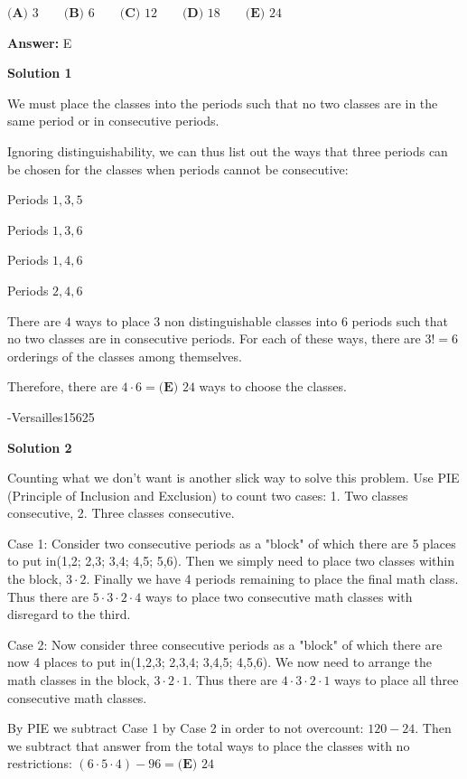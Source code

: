 \begin{enumerate}
 $\textbf{(A) }3\qquad\textbf{(B) }6\qquad\textbf{(C) }12\qquad\textbf{(D) }18\qquad\textbf{(E) }24$

 \textbf{Answer: }E



\textbf{Solution 1}

We must place the classes into the periods such that no two classes are in the same period or in consecutive periods.

 Ignoring distinguishability, we can thus list out the ways that three periods can be chosen for the classes when periods cannot be consecutive:

 Periods $1, 3, 5$

 
Periods $1, 3, 6$

 Periods $1, 4, 6$

 Periods $2, 4, 6$

 There are $4$ ways to place $3$ non distinguishable classes into $6$ periods such that no two classes are in consecutive periods. For each of these ways, there are $3! = 6$ orderings of the classes among themselves.

 Therefore, there are $4 \cdot 6 = \boxed{\textbf{(E) } 24}$ ways to choose the classes.

 -Versailles15625

 



\textbf{Solution 2}

Counting what we don't want is another slick way to solve this problem. Use PIE (Principle of Inclusion and Exclusion) to count two cases: 1. Two classes consecutive, 2. Three classes consecutive. 

 Case 1: Consider two consecutive periods as a "block" of which there are 5 places to put in(1,2; 2,3; 3,4; 4,5; 5,6). Then we simply need to place two classes within the block, $3 \cdot 2$. Finally we have 4 periods remaining to place the final math class. Thus there are $5 \cdot 3 \cdot 2 \cdot 4$ ways to place two consecutive math classes with disregard to the third. 

 Case 2: Now consider three consecutive periods as a "block" of which there are now 4 places to put in(1,2,3; 2,3,4; 3,4,5; 4,5,6). We now need to arrange the math classes in the block, $3 \cdot 2 \cdot 1$. Thus there are $4 \cdot 3 \cdot 2 \cdot 1$ ways to place all three consecutive math classes. 

 By PIE we subtract Case 1 by Case 2 in order to not overcount:  $120-24$. Then we subtract that answer from the total ways to place the classes with no restrictions: $(6 \cdot 5 \cdot 4) - 96= \boxed{\textbf{(E) } 24}$


\end{enumerate}
